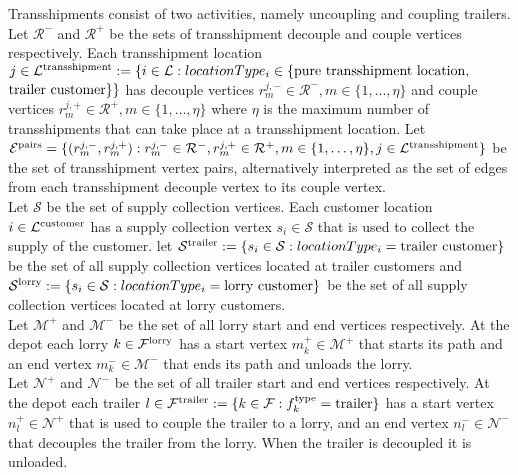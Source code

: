 Transshipments consist of two activities, namely uncoupling and coupling trailers.
Let
$ \mathcal R^- $ and $\mathcal R^+$
be the sets of transshipment decouple and couple vertices respectively.
Each transshipment location
$j \in \mathcal L^{\rm transshipment} :=
\{ i \in \mathcal L: locationType_i \in  \{ {\rm \text{pure transshipment location}}, $ $  {\rm \text{trailer customer}} \} \} $
has decouple vertices
$ r^{j,-}_m \in  \mathcal R^-, m \in \{ 1,\ldots,\eta \}  $
and  couple vertices
$ r^{j,+}_m \in \mathcal R^+, m \in \{ 1,\ldots,\eta \}   $
where $\eta$ is the maximum number of transshipments that can take place at a transshipment location.
 Let
 $\mathcal E^{\rm pairs} = \{  (r^{j,-}_m,r^{j,+}_m ) : r^{j,-}_m \in \mathcal R^- , r^{j,+}_m \in \mathcal R^+, m \in \{ 1,\ldots, \eta \},  j \in \mathcal L^{\rm transshipment}   \}$
 be the set of transshipment vertex pairs, alternatively interpreted as the set of edges from each transshipment decouple vertex to its couple vertex. \\


Let $\mathcal S$ be the set of supply collection vertices.
Each customer location
$i \in \mathcal L^{\rm customer} $
has a supply collection vertex
$s_{i} \in \mathcal S$
that is used to collect the supply of the customer.
let
$\mathcal S^{\rm trailer} := \{ s_i \in \mathcal S: locationType_i = \text{trailer customer} \}$
be the set of all supply collection vertices located at trailer customers and
$\mathcal S^{\rm lorry} := \{ s_i \in \mathcal S: locationType_i = \text{lorry customer} \}$
be the set of all supply collection vertices located at lorry customers.
\\

Let $\mathcal M^{+} $ and $\mathcal M^{-} $ be the set of all lorry start and end vertices respectively.
At the depot each lorry
$k \in \mathcal F^{\rm lorry} $
has a start vertex
$m^+_k \in \mathcal M^{+} $
that starts its path and an end vertex
$m^-_k \in \mathcal M^{-} $
that ends its path and unloads the lorry.\\


Let $\mathcal N^{+} $ and $\mathcal N^{-} $ be the set of all trailer start and end vertices respectively.
At the depot each trailer
$l \in \mathcal F^{\rm trailer} :=
\{k \in \mathcal F: f^{\rm type}_k = \rm trailer\} $
has a start vertex
$n^+_l \in \mathcal N^{+} $
that is used to couple the trailer to a lorry, and an end vertex
$n^-_l \in \mathcal N^{-} $
that decouples the trailer from the lorry. When the trailer is decoupled it is unloaded.\\


